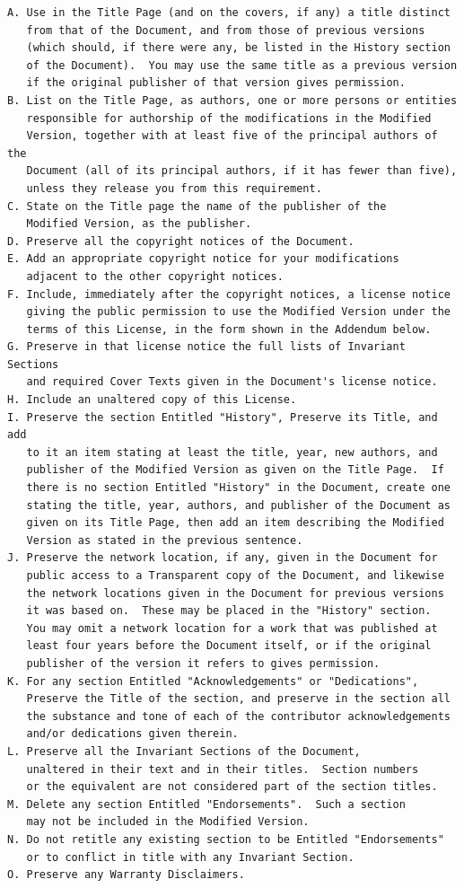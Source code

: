 \documentclass[letterpaper,10pt,english]{sphinxmanual}
\begin{document}
\begin{Verbatim}[commandchars=\\\{\}]
A. Use in the Title Page (and on the covers, if any) a title distinct
   from that of the Document, and from those of previous versions
   (which should, if there were any, be listed in the History section
   of the Document).  You may use the same title as a previous version
   if the original publisher of that version gives permission.
B. List on the Title Page, as authors, one or more persons or entities
   responsible for authorship of the modifications in the Modified
   Version, together with at least five of the principal authors of the
   Document (all of its principal authors, if it has fewer than five),
   unless they release you from this requirement.
C. State on the Title page the name of the publisher of the
   Modified Version, as the publisher.
D. Preserve all the copyright notices of the Document.
E. Add an appropriate copyright notice for your modifications
   adjacent to the other copyright notices.
F. Include, immediately after the copyright notices, a license notice
   giving the public permission to use the Modified Version under the
   terms of this License, in the form shown in the Addendum below.
G. Preserve in that license notice the full lists of Invariant Sections
   and required Cover Texts given in the Document's license notice.
H. Include an unaltered copy of this License.
I. Preserve the section Entitled "History", Preserve its Title, and add
   to it an item stating at least the title, year, new authors, and
   publisher of the Modified Version as given on the Title Page.  If
   there is no section Entitled "History" in the Document, create one
   stating the title, year, authors, and publisher of the Document as
   given on its Title Page, then add an item describing the Modified
   Version as stated in the previous sentence.
J. Preserve the network location, if any, given in the Document for
   public access to a Transparent copy of the Document, and likewise
   the network locations given in the Document for previous versions
   it was based on.  These may be placed in the "History" section.
   You may omit a network location for a work that was published at
   least four years before the Document itself, or if the original
   publisher of the version it refers to gives permission.
K. For any section Entitled "Acknowledgements" or "Dedications",
   Preserve the Title of the section, and preserve in the section all
   the substance and tone of each of the contributor acknowledgements
   and/or dedications given therein.
L. Preserve all the Invariant Sections of the Document,
   unaltered in their text and in their titles.  Section numbers
   or the equivalent are not considered part of the section titles.
M. Delete any section Entitled "Endorsements".  Such a section
   may not be included in the Modified Version.
N. Do not retitle any existing section to be Entitled "Endorsements"
   or to conflict in title with any Invariant Section.
O. Preserve any Warranty Disclaimers.


\end{Verbatim}
\end{document}

